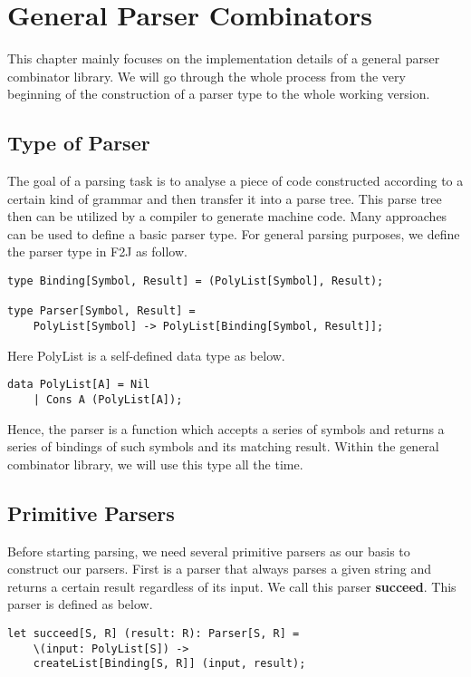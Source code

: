 \chapter{General Parser Combinators}
This chapter mainly focuses on the implementation details of a general parser combinator library. We will go through the whole process from the very beginning of the construction of a parser type to the whole working version.

\section{Type of Parser}
The goal of a parsing task is to analyse a piece of code constructed according to a certain kind of grammar and then transfer it into a parse tree. This parse tree then can be utilized by a compiler to generate machine code. Many approaches can be used to define a basic parser type. For general parsing purposes, we define the parser type in F2J as follow.

\begin{lstlisting}
type Binding[Symbol, Result] = (PolyList[Symbol], Result);

type Parser[Symbol, Result] =
	PolyList[Symbol] -> PolyList[Binding[Symbol, Result]];
\end{lstlisting}

Here PolyList is a self-defined data type as below.

\begin{lstlisting}
data PolyList[A] = Nil
	| Cons A (PolyList[A]);
\end{lstlisting}

Hence, the parser is a function which accepts a series of symbols and returns a series of bindings of such symbols and its matching result. Within the general combinator library, we will use this type all the time.

\section{Primitive Parsers}
Before starting parsing, we need several primitive parsers as our basis to construct our parsers. First is a parser that always parses a given string and returns a certain result regardless of its input. We call this parser \textbf{succeed}. This parser is defined as below.

\begin{lstlisting}
let succeed[S, R] (result: R): Parser[S, R] =
	\(input: PolyList[S]) ->
	createList[Binding[S, R]] (input, result);
\end{lstlisting}

